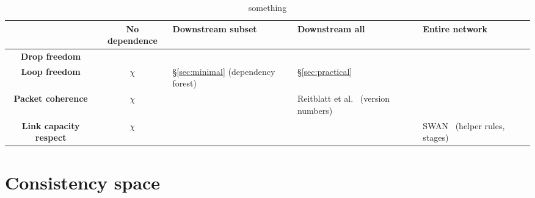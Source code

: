 \begin{table*}[t!]
\begin{center}
\begin{tabular}{c|c|p{1in}|p{1in}|p{1in}|}
&
  \textbf{No dependence}
&
  \textbf{Downstream subset}
&
  \textbf{Downstream all}
&
  \textbf{Entire network}
\ \\ \hline

  \textbf{Drop freedom}
&
\ \\ \hline

  \textbf{Loop freedom}
&
  $\chi$
&
  \S\ref{sec:minimal} (dependency forest)
&
  \S\ref{sec:practical}
&
\ \\ \hline

  \textbf{Packet coherence}
&
  $\chi$
&
&
  Reitblatt et al.~\cite{safeupdate} (version numbers)
&
\ \\ \hline

  \textbf{Link capacity respect}
&
  $\chi$
&
&
&
  SWAN~\cite{swan} (helper rules, stages)
\ \\ \hline
\end{tabular}
\end{center}
\caption{something}
\label{tbl:big}
\end{table*} 


\section{Consistency space}
\label{sec:table}

